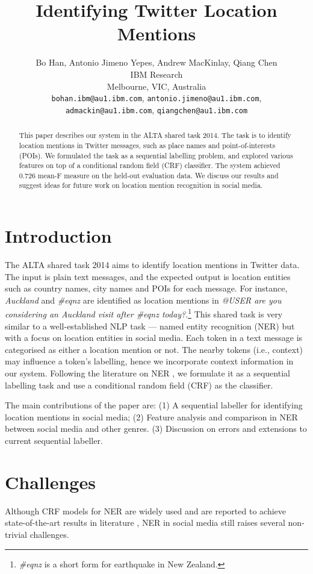 \documentclass[11pt]{article}
\title{Identifying Twitter Location Mentions}
\author{Bo Han, Antonio Jimeno Yepes, Andrew MacKinlay, Qiang Chen \\
  IBM Research \\
  Melbourne, VIC, Australia \\
  {\tt bohan.ibm@au1.ibm.com}, {\tt antonio.jimeno@au1.ibm.com}, \\
  {\tt admackin@au1.ibm.com}, {\tt qiangchen@au1.ibm.com} 
  \\}
\date{}
\newcommand{\ie}{i.e.,\xspace}
\newcommand{\myex}[1]{\textit{#1}}
\begin{document}
\maketitle
\begin{abstract}
    This paper describes our system in the ALTA shared task 2014.
    The task is to identify location mentions in Twitter messages, such as place names and point-of-interests (POIs).
    We formulated the task as a sequential labelling problem, and explored various features on top of a conditional random field (CRF) classifier.
    The system achieved 0.726 mean-F measure on the held-out evaluation data.
    We discuss our results and suggest ideas for future work on location mention recognition in social media.
\end{abstract}

\section{Introduction}
\label{sec:intro}
The ALTA shared task 2014 aims to identify location mentions in Twitter data.
The input is plain text messages, and the expected output is location entities such as country names, city names and POIs for each message.
For instance, \myex{Auckland} and \myex{\#eqnz} are identified as location mentions in \myex{@USER are you considering an Auckland visit after \#eqnz today?}.\footnote{\myex{\#eqnz} is a short form for earthquake in New Zealand.}
This shared task is very similar to a well-established NLP task --- named entity recognition (NER) but with a focus on location entities in social media.
Each token in a text message is categorised as either a location mention or not.
The nearby tokens (\ie context) may influence a token's labelling, hence we incorporate context information in our system.
Following the literature on NER \cite{wwwc13ling}, we formulate it as a sequential labelling task and use a conditional random field (CRF) as the classifier.

The main contributions of the paper are:
(1) A sequential labeller for identifying location mentions in social media;
(2) Feature analysis and comparison in NER between social media and other genres.
(3) Discussion on errors and extensions to current sequential labeller.

\section{Challenges}
\label{sec:challenge}
Although CRF models for NER are widely used and are reported to achieve state-of-the-art results in literature \cite{acl05fink,acl11liux,emnlp11ritt}, NER in social media still raises several non-trivial challenges.
\end{document}
